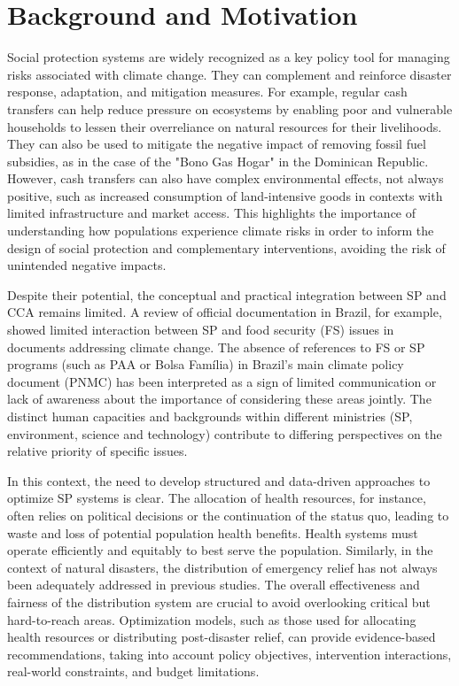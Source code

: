 \section{Background and Motivation}
Social protection systems are widely recognized as a key policy tool
for managing risks associated with climate change. They can
complement and reinforce disaster response, adaptation, and
mitigation measures. For example, regular cash transfers can help
reduce pressure on ecosystems by enabling poor and vulnerable
households to lessen their overreliance on natural resources for
their livelihoods. They can also be used to mitigate the negative
impact of removing fossil fuel subsidies, as in the case of the
"Bono Gas Hogar" in the Dominican Republic. However, cash transfers
can also have complex environmental effects, not always positive,
such as increased consumption of land-intensive goods in contexts
with limited infrastructure and market access. This highlights the
importance of understanding how populations experience climate
risks in order to inform the design of social protection and
complementary interventions, avoiding the risk of unintended
negative impacts.

Despite their potential, the conceptual and practical integration
between SP and CCA remains limited. A review of official
documentation in Brazil, for example, showed limited interaction
between SP and food security (FS) issues in documents addressing
climate change. The absence of references to FS or SP programs
(such as PAA or Bolsa Família) in Brazil's main climate policy
document (PNMC) has been interpreted as a sign of limited
communication or lack of awareness about the importance of
considering these areas jointly. The distinct human capacities and
backgrounds within different ministries (SP, environment, science
and technology) contribute to differing perspectives on the
relative priority of specific issues.

In this context, the need to develop structured and data-driven
approaches to optimize SP systems is clear. The allocation of health
resources, for instance, often relies on political decisions or the
continuation of the status quo, leading to waste and loss of
potential population health benefits. Health systems must operate
efficiently and equitably to best serve the population. Similarly,
in the context of natural disasters, the distribution of emergency
relief has not always been adequately addressed in previous studies.
The overall effectiveness and fairness of the distribution system
are crucial to avoid overlooking critical but hard-to-reach areas.
Optimization models, such as those used for allocating health
resources or distributing post-disaster relief, can provide
evidence-based recommendations, taking into account policy
objectives, intervention interactions, real-world constraints, and
budget limitations.


